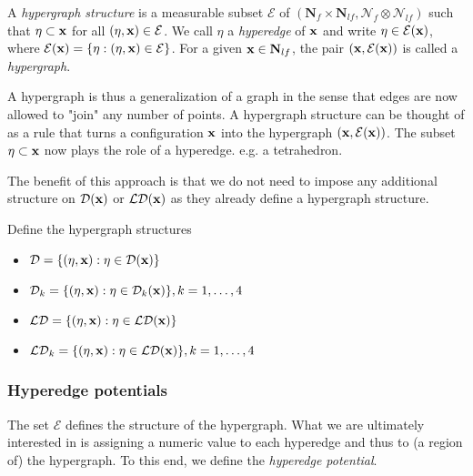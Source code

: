 \begin{definition}
	A \textit{hypergraph structure} is a measurable subset $\mathcal E$ of $(\mathbf N_f\times \mathbf N_{lf}, \mathcal N_f \otimes \mathcal N_{lf})$ such that $\eta \subset {\mathbf{x}}$ for all $(\eta,{\mathbf{x}})\in\mathcal E$. We call $\eta$ a \textit{hyperedge} of ${\mathbf{x}}$ and write $\eta \in \mathcal E({\mathbf{x}})$, where $\mathcal E({\mathbf{x}}) = \{\eta: (\eta,{\mathbf{x}}) \in \mathcal E\}$. For a given ${\mathbf{x}} \in \mathbf N_{lf}$, the pair $({\mathbf{x}}, \mathcal E({\mathbf{x}}))$ is called a \textit{hypergraph}.
\end{definition}
A hypergraph is thus a generalization of a graph in the sense that edges are now allowed to "join" any number of points. A hypergraph structure can be thought of as a rule that turns a configuration ${\mathbf{x}}$ into the hypergraph $({\mathbf{x}},\mathcal E({\mathbf{x}}))$. 
The subset $\eta \subset {\mathbf{x}}$ now plays the role of a hyperedge. e.g. a tetrahedron.

The benefit of this approach is that we do not need to impose any additional structure on $\mathcal D({\mathbf{x}})$ or $\mathcal {LD}({\mathbf{x}})$ as they already define a hypergraph structure. 

\begin{definition}
	Define the hypergraph structures
	\begin{itemize}
		\item $\mathcal D = \{(\eta,{\mathbf{x}}): \eta \in \mathcal D({\mathbf{x}})\}$
		\item 	$\mathcal D_k = \{(\eta,{\mathbf{x}}): \eta \in \mathcal D_k({\mathbf{x}})\}, k=1,\dots,4$
		\item 	$\mathcal {LD} = \{(\eta,{\mathbf{x}}): \eta \in \mathcal {LD}({\mathbf{x}})\}$
		\item 	$\mathcal {LD}_k = \{(\eta,{\mathbf{x}}): \eta \in \mathcal {LD}({\mathbf{x}})\}, k=1,\dots,4$
	\end{itemize}
\end{definition}


\subsubsection{Hyperedge potentials}
The set $\mathcal E$ defines the structure of the hypergraph. What we are ultimately interested in is assigning a numeric value to each hyperedge and thus to (a region of) the hypergraph. To this end, we define the \textit{hyperedge potential}.

